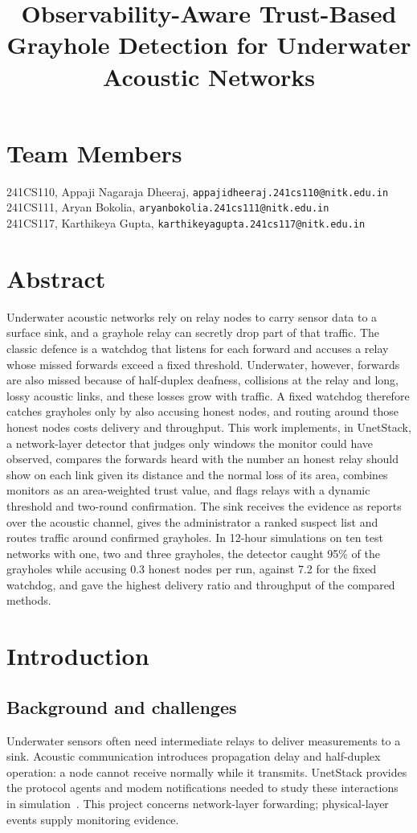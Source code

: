 \documentclass{article}
\title{\textbf{Observability-Aware Trust-Based Grayhole Detection for Underwater Acoustic Networks}}
\author{}
\date{}
\begin{document}
\maketitle
\section*{Team Members}
\noindent 241CS110, Appaji Nagaraja Dheeraj, \texttt{appajidheeraj.241cs110@nitk.edu.in}\\
241CS111, Aryan Bokolia, \texttt{aryanbokolia.241cs111@nitk.edu.in}\\
241CS117, Karthikeya Gupta, \texttt{karthikeyagupta.241cs117@nitk.edu.in}

\section*{Abstract}
\noindent
Underwater acoustic networks rely on relay nodes to carry sensor data to a surface sink, and a grayhole relay can secretly drop part of that traffic. The classic defence is a watchdog that listens for each forward and accuses a relay whose missed forwards exceed a fixed threshold. Underwater, however, forwards are also missed because of half-duplex deafness, collisions at the relay and long, lossy acoustic links, and these losses grow with traffic. A fixed watchdog therefore catches grayholes only by also accusing honest nodes, and routing around those honest nodes costs delivery and throughput. This work implements, in UnetStack, a network-layer detector that judges only windows the monitor could have observed, compares the forwards heard with the number an honest relay should show on each link given its distance and the normal loss of its area, combines monitors as an area-weighted trust value, and flags relays with a dynamic threshold and two-round confirmation. The sink receives the evidence as reports over the acoustic channel, gives the administrator a ranked suspect list and routes traffic around confirmed grayholes. In 12-hour simulations on ten test networks with one, two and three grayholes, the detector caught 95\% of the grayholes while accusing 0.3 honest nodes per run, against 7.2 for the fixed watchdog, and gave the highest delivery ratio and throughput of the compared methods.

\section{Introduction}\label{sec:intro}
\subsection{Background and challenges}
Underwater sensors often need intermediate relays to deliver measurements to a sink. Acoustic communication introduces propagation delay and half-duplex operation: a node cannot receive normally while it transmits. UnetStack provides the protocol agents and modem notifications needed to study these interactions in simulation~\cite{unet}. This project concerns network-layer forwarding; physical-layer events supply monitoring evidence.
\end{document}
